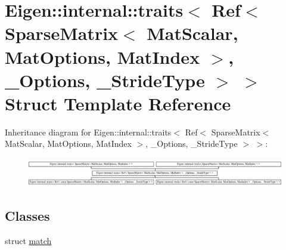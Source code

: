\hypertarget{struct_eigen_1_1internal_1_1traits_3_01_ref_3_01_sparse_matrix_3_01_mat_scalar_00_01_mat_optionsa860cad8c30d0eada972a685a49da86f}{}\section{Eigen\+:\+:internal\+:\+:traits$<$ Ref$<$ Sparse\+Matrix$<$ Mat\+Scalar, Mat\+Options, Mat\+Index $>$, \+\_\+\+Options, \+\_\+\+Stride\+Type $>$ $>$ Struct Template Reference}
\label{struct_eigen_1_1internal_1_1traits_3_01_ref_3_01_sparse_matrix_3_01_mat_scalar_00_01_mat_optionsa860cad8c30d0eada972a685a49da86f}
Inheritance diagram for Eigen\+:\+:internal\+:\+:traits$<$ Ref$<$ Sparse\+Matrix$<$ Mat\+Scalar, Mat\+Options, Mat\+Index $>$, \+\_\+\+Options, \+\_\+\+Stride\+Type $>$ $>$\+:\begin{figure}[H]
\begin{center}
\leavevmode
\includegraphics[height=1.270802cm]{struct_eigen_1_1internal_1_1traits_3_01_ref_3_01_sparse_matrix_3_01_mat_scalar_00_01_mat_optionsa860cad8c30d0eada972a685a49da86f}
\end{center}
\end{figure}
\subsection*{Classes}
\begin{DoxyCompactItemize}
\item 
struct \hyperlink{struct_eigen_1_1internal_1_1traits_3_01_ref_3_01_sparse_matrix_3_01_mat_scalar_00_01_mat_optionsc6ef0ce4e339306d76a1e27f17721ded}{match}
\end{DoxyCompactItemize}
